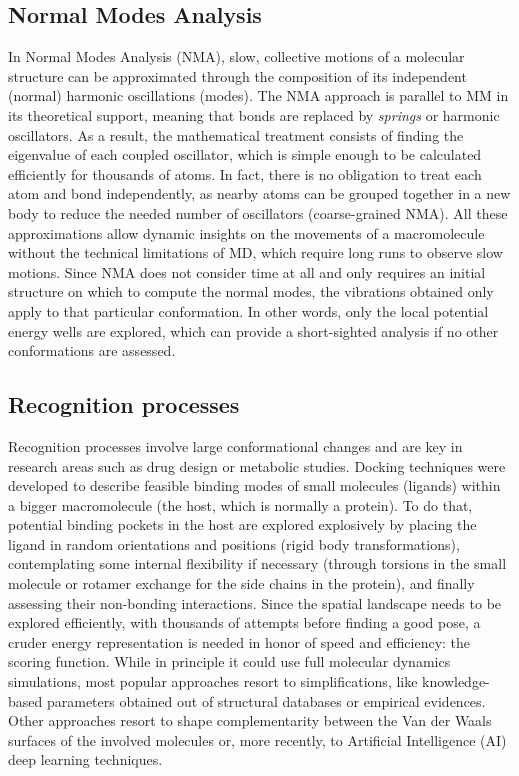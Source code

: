 \subsection{Normal Modes Analysis}

In Normal Modes Analysis (NMA), slow, collective motions of a molecular structure can be approximated through the composition of its independent (normal) harmonic oscillations (modes). The NMA approach is parallel to MM in its theoretical support, meaning that bonds are replaced by \textit{springs} or harmonic oscillators. As a result, the mathematical treatment consists of finding the eigenvalue of each coupled oscillator, which is simple enough to be calculated efficiently for thousands of atoms. In fact, there is no obligation to treat each atom and bond independently, as nearby atoms can be grouped together in a new body to reduce the needed number of oscillators (coarse-grained NMA). All these approximations allow dynamic insights on the movements of a macromolecule without the technical limitations of MD, which require long runs to observe slow motions. Since NMA does not consider time at all and only requires an initial structure on which to compute the normal modes, the vibrations obtained only apply to that particular conformation. In other words, only the local potential energy wells are explored, which can provide a short-sighted analysis if no other conformations are assessed.

\subsection{Recognition processes}

Recognition processes involve large conformational changes and are key in research areas such as drug design or metabolic studies. Docking techniques were developed to describe feasible binding modes of small molecules (ligands) within a bigger macromolecule (the host, which is normally a protein). To do that, potential binding pockets in the host are explored explosively by placing the ligand in random orientations and positions (rigid body transformations), contemplating some internal flexibility if necessary (through torsions in the small molecule or rotamer exchange for the side chains in the protein), and finally assessing their non-bonding interactions. Since the spatial landscape needs to be explored efficiently, with thousands of attempts before finding a good pose, a cruder energy representation is needed in honor of speed and efficiency: the scoring function. While in principle it could use full molecular dynamics simulations,\cite{Soderhjelm_Tribello_Parrinello_2012,devivo2017} most popular approaches resort to simplifications, like knowledge-based parameters obtained out of structural databases\cite{neudert2011dsx} or empirical evidences.\cite{morris1998automated,baxter1998flexible,korb2009empirical} Other approaches resort to shape complementarity between the Van der Waals surfaces of the involved molecules\cite{venkatachalam2003ligandfit,gabb1997modelling,shoichet1992molecular} or, more recently, to Artificial Intelligence (AI) deep learning techniques.\cite{khamis2015machine}

